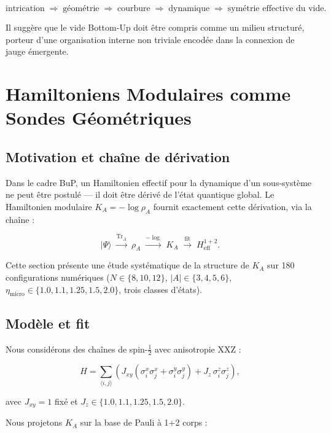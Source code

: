 \documentclass[11pt]{article}
\begin{document}
\[
\text{intrication}
\;\Longrightarrow\;
\text{géométrie}
\;\Longrightarrow\;
\text{courbure}
\;\Longrightarrow\;
\text{dynamique}
\;\Longrightarrow\;
\text{symétrie effective du vide}.
\]

Il suggère que le vide Bottom-Up doit être compris comme un milieu structuré, porteur d'une organisation interne non triviale encodée dans la connexion de jauge émergente.


\section{Hamiltoniens Modulaires comme Sondes Géométriques}

\subsection{Motivation et chaîne de dérivation}

Dans le cadre BuP, un Hamiltonien effectif pour la dynamique d'un sous-système ne peut être postulé --- il doit être dérivé de l'état quantique global. Le Hamiltonien modulaire $K_A = -\log\rho_A$ fournit exactement cette dérivation, via la chaîne :

\[
|\Psi\rangle
\;\xrightarrow{\mathrm{Tr}_{\bar{A}}}\;
\rho_A
\;\xrightarrow{-\log}\;
K_A
\;\xrightarrow{\mathrm{fit}}\;
H_{\mathrm{eff}}^{1+2}.
\]

Cette section présente une étude systématique de la structure de $K_A$ sur 180 configurations numériques ($N \in \{8,10,12\}$, $|A| \in \{3,4,5,6\}$, $\eta_{\mathrm{micro}} \in \{1.0, 1.1, 1.25, 1.5, 2.0\}$, trois classes d'états).

\subsection{Modèle et fit}

Nous considérons des chaînes de spin-$\tfrac{1}{2}$ avec anisotropie XXZ :

\[
H = \sum_{\langle i,j\rangle}
\left( J_{xy}(\sigma_i^x\sigma_j^x + \sigma_i^y\sigma_j^y) + J_z\,\sigma_i^z\sigma_j^z \right),
\]

avec $J_{xy}=1$ fixé et $J_z \in \{1.0, 1.1, 1.25, 1.5, 2.0\}$.

Nous projetons $K_A$ sur la base de Pauli à 1+2 corps :
\end{document}

